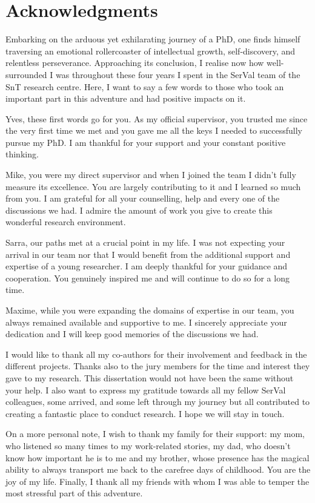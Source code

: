 \chapter*{Acknowledgments}

Embarking on the arduous yet exhilarating journey of a PhD, one finds himself traversing an emotional rollercoaster of intellectual growth, self-discovery, and relentless perseverance. Approaching its conclusion, I realise now how well-surrounded I was throughout these four years I spent in the SerVal team of the SnT research centre. Here, I want to say a few words to those who took an important part in this adventure and had positive impacts on it.

Yves, these first words go for you. As my official supervisor, you trusted me since the very first time we met and you gave me all the keys I needed to successfully pursue my PhD. I am thankful for your support and your constant positive thinking.

Mike, you were my direct supervisor and when I joined the team I didn't fully measure its excellence. You are largely contributing to it and I learned so much from you. I am grateful for all your counselling, help and every one of the discussions we had. I admire the amount of work you give to create this wonderful research environment.

Sarra, our paths met at a crucial point in my life. I was not expecting your arrival in our team nor that I would benefit from the additional support and expertise of a young researcher. I am deeply thankful for your guidance and cooperation. You genuinely inspired me and will continue to do so for a long time.

Maxime, while you were expanding the domains of expertise in our team, you always remained available and supportive to me. I sincerely appreciate your dedication and I will keep good memories of the discussions we had.

I would like to thank all my co-authors for their involvement and feedback in the different projects. Thanks also to the jury members for the time and interest they gave to my research. This dissertation would not have been the same without your help. I also want to express my gratitude towards all my fellow SerVal colleagues, some arrived, and some left through my journey but all contributed to creating a fantastic place to conduct research. I hope we will stay in touch.

On a more personal note, I wish to thank my family for their support: my mom, who listened so many times to my work-related stories, my dad, who doesn't know how important he is to me and my brother, whose presence has the magical ability to always transport me back to the carefree days of childhood. You are the joy of my life. Finally, I thank all my friends with whom I was able to temper the most stressful part of this adventure.
